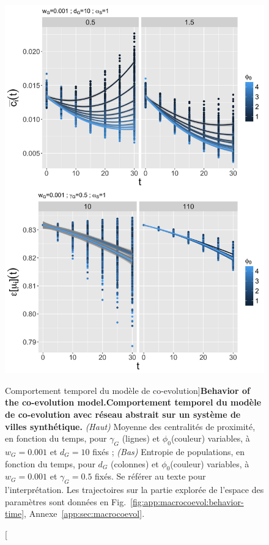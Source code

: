 \begin{figure}
\includegraphics[width=\linewidth,height=0.9\textheight]{Figures/Final/6-2-2-fig-macrocoevol-behavior-time.jpg}
\caption[Behavior of the co-evolution model][Comportement temporel du modèle de co-evolution]{\textbf{Behavior of the co-evolution model.}\label{fig:macrocoevol:behavior-time}}{\textbf{Comportement temporel du modèle de co-evolution avec réseau abstrait sur un système de villes synthétique.} \textit{(Haut)} Moyenne des centralités de proximité, en fonction du temps, pour $\gamma_G$ (lignes) et $\phi_0$(couleur) variables, à $w_G = 0.001$ et $d_G = 10$ fixés ; \textit{(Bas)} Entropie de populations, en fonction du temps, pour $d_G$ (colonnes) et $\phi_0$(couleur) variables, à $w_G = 0.001$ et $\gamma_G = 0.5$ fixés. Se référer au texte pour l'interprétation. Les trajectoires sur la partie explorée de l'espace des paramètres sont données en Fig.~\ref{fig:app:macrocoevol:behavior-time}, Annexe~\ref{app:sec:macrocoevol}.\label{fig:macrocoevol:behavior-time}}
\end{figure}



